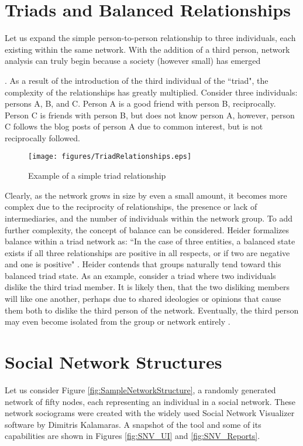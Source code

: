 \section{Triads and Balanced Relationships}
Let us expand the simple person-to-person relationship to three individuals, each existing within the same network. With the addition of a third person, network analysis can truly begin because a society (however small) has emerged {\cite{simmel1950sociology}. As a result of the introduction of the third individual of the ``triad", the complexity of the relationships has greatly multiplied. Consider three individuals: persons A, B, and C. Person A is a good friend with person B, reciprocally. Person C is friends with person B, but does not know person A, however, person C follows the blog posts of person A due to common interest, but is not reciprocally followed. 

\begin{figure}[!htbp] \centering
  \texttt{[image: figures/TriadRelationships.eps]}
  \caption{Example of a simple triad relationship}
  \label{fig:TriadRelationships}
\end{figure}

Clearly, as the network grows in size by even a small amount, it becomes more complex due to the reciprocity of relationships, the presence or lack of intermediaries, and the number of individuals within the network group. To add further complexity, the concept of balance can be considered. Heider formalizes balance within a triad network as: ``In the case of three entities, a balanced state exists if all three relationships are positive in all respects, or if two are negative and one is positive" \cite{heider1946attitudes}. Heider contends that groups naturally tend toward this balanced triad state. As an example, consider a triad where two individuals dislike the third triad member. It is likely then, that the two disliking members will like one another, perhaps due to shared ideologies or opinions that cause them both to dislike the third person of the network. Eventually, the third person may even become isolated from the group or network entirely \cite{kadushin2012understanding}.

\section{Social Network Structures}
Let us consider Figure \ref{fig:SampleNetworkStructure}, a randomly generated network of fifty nodes, each representing an individual in a social network. These network sociograms were created with the widely used Social Network Visualizer software by Dimitris Kalamaras. A snapshot of the tool and some of its capabilities are shown in Figures \ref{fig:SNV_UI} and \ref{fig:SNV_Reports}.

}

